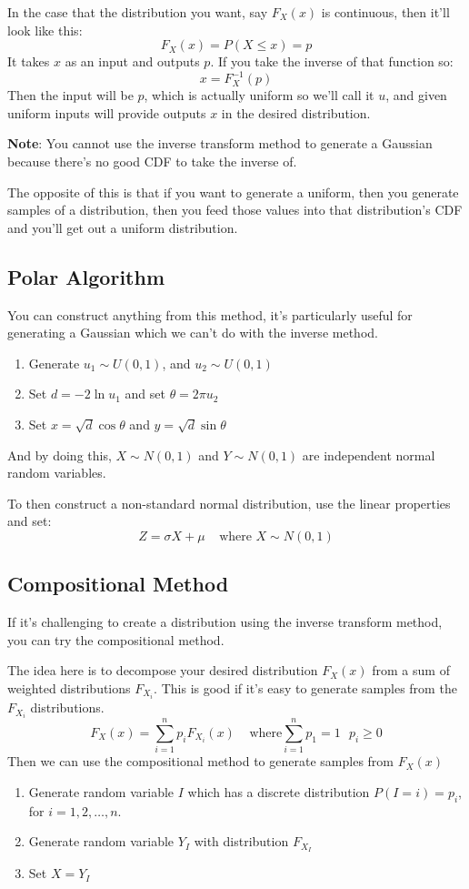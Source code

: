 \documentclass{report}
\begin{document}
In the case that the distribution you want, say $F_X(x)$ is continuous, then it'll look like this: $$F_X(x) = P(X \leq x) = p$$ It takes $x$ as an input and outputs $p$. If you take the inverse of that function so: $$x = F^{-1}_X(p)$$ Then the input will be $p$, which is actually uniform so we'll call it $u$, and given uniform inputs will provide outputs $x$ in the desired distribution.

\textbf{Note}: You cannot use the inverse transform method to generate a Gaussian because there's no good CDF to take the inverse of.

The opposite of this is that if you want to generate a uniform, then you generate samples of a distribution, then you feed those values into that distribution's CDF and you'll get out a uniform distribution.

\subsection{Polar Algorithm}

You can construct anything from this method, it's particularly useful for generating a Gaussian which we can't do with the inverse method. 

\begin{enumerate}
\item Generate $u_1 \sim U(0,1)$, and $u_2 \sim U(0,1)$
\item Set $d=-2\ln{u_1}$ and set $\theta=2\pi u_2$
\item Set $x=\sqrt{d} \cos \theta$ and $y=\sqrt{d}\sin\theta$
\end{enumerate}

And by doing this, $X\sim N(0,1)$ and $Y\sim N(0,1)$ are independent normal random variables.

To then construct a non-standard normal distribution, use the linear properties and set: $$Z = \sigma X + \mu \ \ \ \ \ \text{where } X \sim N(0,1)$$


\subsection{Compositional Method}

If it's challenging to create a distribution using the inverse transform method, you can try the compositional method. 

The idea here is to decompose your desired distribution $F_X(x)$ from a sum of weighted distributions $F_{X_i}$. This is good if it's easy to generate samples from the  $F_{X_i}$ distributions. $$F_X(x) = \sum_{i=1}^n p_i F_{X_i}(x) \ \ \ \ \ \text{where} \sum_{i=1}^n p_1 = 1 \ \ \ p_i \geq 0$$ Then we can use the compositional method to generate samples from $F_X(x)$ \begin{enumerate}
\item Generate random variable $I$ which has a discrete distribution $P(I=i)=p_i$, for $i=1,2,\dots,n$.
\item Generate random variable $Y_I$ with distribution $F_{X_I}$ 
\item Set $X = Y_I$
\end{enumerate}
\end{document}
